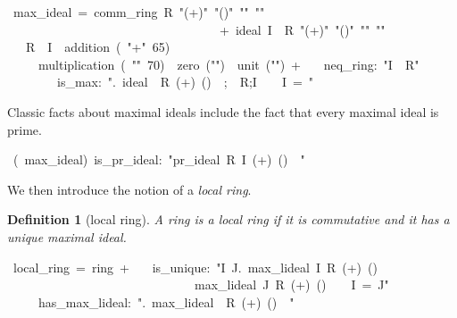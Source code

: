 \documentclass[12pt]{scrartcl}
\newtheorem{definition}[proposition]{Definition}
\begin{document}
\begin{isabelle}
\ max\_ideal\ =\ comm\_ring\ R\ "(+)"\ "(\isasymcdot )"\ "\isasymzero "\ "\isasymone "\ \isanewline
\ \ \ \ \ \ \ \ \ \ \ \ \ \ \ \ \ \ \ \ \ \ \ \ \ \ \ \ \ \ \ \ \ \ +\ ideal\ I\ \ R\ "(+)"\ "(\isasymcdot )"\ "\isasymzero "\ "\isasymone "\isanewline
\ \ \ R\ \ I\ \ addition\ (\ "+"\ 65)\ \isanewline
\ \ \ \ \ multiplication\ (\ "\isasymcdot "\ 70)\ \ zero\ ("\isasymzero ")\ \ unit\ ("\isasymone ")\ +\isanewline
\ \ \ neq\_ring:\ "I\ \isasymnoteq \ R"\ \isanewline
\ \ \ \ \ \ \ \ is\_max:\ "\isasymAnd \isasymaa .\ \isasymlbrakk ideal\ \isasymaa \ R\ (+)\ (\isasymcdot )\ \isasymzero \ \isasymone ;\isasymaa \ \isasymnoteq \ R;I\ \isasymsubseteq \ \isasymaa \ \isasymrbrakk \isasymLongrightarrow \ I\ =\ \isasymaa "
\end{isabelle}


Classic facts about maximal ideals include the fact that every maximal ideal is prime.

\begin{isabelle}
\ (\ max\_ideal)\ is\_pr\_ideal:\ "pr\_ideal\ R\ I\ (+)\ (\isasymcdot )\ \isasymzero \ \isasymone "
\end{isabelle}
	
We then introduce the notion of a \emph{local ring}.

\begin{definition}[local ring]
	A ring is a local ring if it is commutative and it has a unique maximal ideal. 	
\end{definition}

\begin{isabelle}
\ local\_ring\ =\ ring\ +\isanewline
\ \ \ is\_unique:\ "\isasymAnd I\ J.\ max\_lideal\ I\ R\ (+)\ (\isasymcdot )\ \isasymzero \ \isasymone \isanewline
\ \ \ \ \ \ \ \ \ \ \ \ \ \ \ \ \ \ \ \ \ \ \ \ \ \ \ \ \ \isasymLongrightarrow \ max\_lideal\ J\ R\ (+)\ (\isasymcdot )\ \isasymzero \ \isasymone \ \isasymLongrightarrow \ I\ =\ J"\isanewline
\ \ \ \ \ has\_max\_lideal:\ "\isasymexists \isasymww .\ max\_lideal\ \isasymww \ R\ (+)\ (\isasymcdot )\ \isasymzero \ \isasymone "
\end{isabelle}
\end{document}
